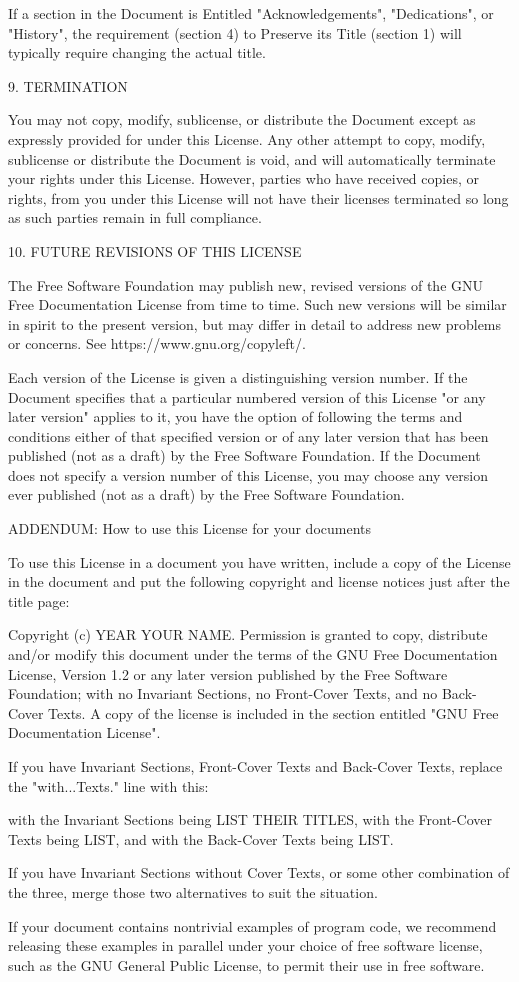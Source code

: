 \documentclass[
  english,
  11pt,
  a4paper,
]{article}
\begin{document}
If a section in the Document is Entitled "Acknowledgements",
"Dedications", or "History", the requirement (section 4) to Preserve its
Title (section 1) will typically require changing the actual title.

9. TERMINATION

You may not copy, modify, sublicense, or distribute the Document except
as expressly provided for under this License. Any other attempt to copy,
modify, sublicense or distribute the Document is void, and will
automatically terminate your rights under this License. However, parties
who have received copies, or rights, from you under this License will
not have their licenses terminated so long as such parties remain in
full compliance.

10. FUTURE REVISIONS OF THIS LICENSE

The Free Software Foundation may publish new, revised versions of the
GNU Free Documentation License from time to time. Such new versions will
be similar in spirit to the present version, but may differ in detail to
address new problems or concerns. See https://www.gnu.org/copyleft/.

Each version of the License is given a distinguishing version number. If
the Document specifies that a particular numbered version of this
License "or any later version" applies to it, you have the option of
following the terms and conditions either of that specified version or
of any later version that has been published (not as a draft) by the
Free Software Foundation. If the Document does not specify a version
number of this License, you may choose any version ever published (not
as a draft) by the Free Software Foundation.

ADDENDUM: How to use this License for your documents

To use this License in a document you have written, include a copy of
the License in the document and put the following copyright and license
notices just after the title page:

Copyright (c) YEAR YOUR NAME. Permission is granted to copy, distribute
and/or modify this document under the terms of the GNU Free
Documentation License, Version 1.2 or any later version published by the
Free Software Foundation; with no Invariant Sections, no Front-Cover
Texts, and no Back-Cover Texts. A copy of the license is included in the
section entitled "GNU Free Documentation License".

If you have Invariant Sections, Front-Cover Texts and Back-Cover Texts,
replace the "with...Texts." line with this:

with the Invariant Sections being LIST THEIR TITLES, with the
Front-Cover Texts being LIST, and with the Back-Cover Texts being LIST.

If you have Invariant Sections without Cover Texts, or some other
combination of the three, merge those two alternatives to suit the
situation.

If your document contains nontrivial examples of program code, we
recommend releasing these examples in parallel under your choice of free
software license, such as the GNU General Public License, to permit
their use in free software.
\end{document}

